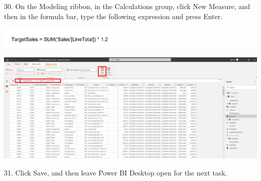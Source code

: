 \documentclass[12pt,letterpaper]{article}
\begin{document}
30. On the Modeling ribbon, in the Calculations group, click New Measure, and then in the formula bar, type the
following expression and press Enter.
\begin{center}
    \includegraphics[width=6cm]{img/115.png}  
\end{center}
\begin{center}
    \includegraphics[width=17.5cm]{img/38.png}
    \vspace{2cm}  
\end{center}
31. Click Save, and then leave Power BI Desktop open for the next task.
\end{document}
